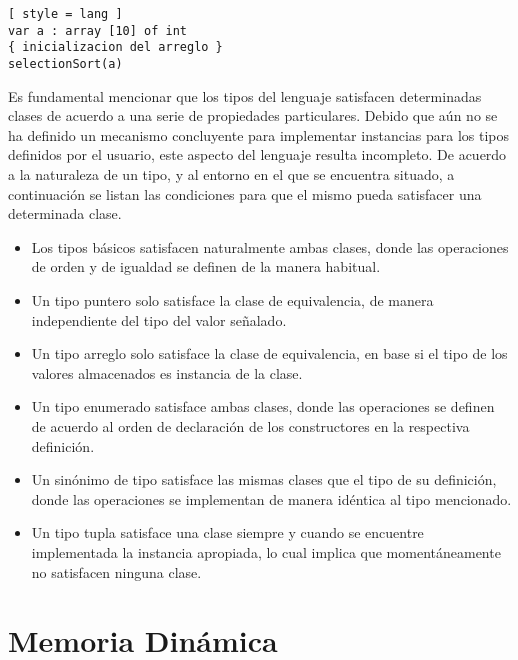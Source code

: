 \begin{lstlisting}[ style = lang ]
var a : array [10] of int
{ inicializacion del arreglo }
selectionSort(a)
\end{lstlisting}

Es fundamental mencionar que los tipos del lenguaje satisfacen determinadas clases de acuerdo a una serie de propiedades particulares.
Debido que aún no se ha definido un mecanismo concluyente para implementar instancias para los tipos definidos por el usuario, este aspecto del lenguaje resulta incompleto.
De acuerdo a la naturaleza de un tipo, y al entorno en el que se encuentra situado, a continuación se listan las condiciones para que el mismo pueda satisfacer una determinada clase.
\begin{itemize}
\item
Los tipos básicos satisfacen naturalmente ambas clases, donde las operaciones de orden y de igualdad se definen de la manera habitual.
\item
Un tipo puntero solo satisface la clase de equivalencia, de manera independiente del tipo del valor señalado.
\item
Un tipo arreglo solo satisface la clase de equivalencia, en base si el tipo de los valores almacenados es instancia de la clase.
\item
Un tipo enumerado satisface ambas clases, donde las operaciones se definen de acuerdo al orden de declaración de los constructores en la respectiva definición.
\item
Un sinónimo de tipo satisface las mismas clases que el tipo de su definición, donde las operaciones se implementan de manera idéntica al tipo mencionado.
\item
Un tipo tupla satisface una clase siempre y cuando se encuentre implementada la instancia apropiada, lo cual implica que momentáneamente no satisfacen ninguna clase.
\end{itemize}
\fi



\section{Memoria Dinámica}

